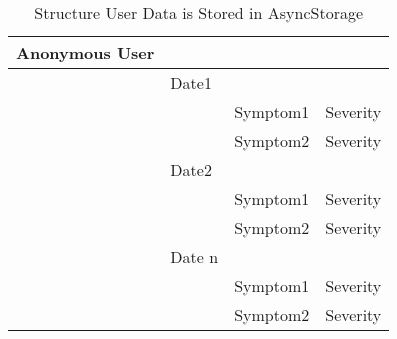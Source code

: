   \begin{table}[h!!]
    \caption{Structure User Data is Stored in AsyncStorage}
    \label{table:user-data}
    \begin{tabular}{llll}
    \hline
    Anonymous User &        &          &          \\ \hline
                  & Date1  &          &          \\
                  &        & Symptom1 & Severity \\
                  &        & Symptom2 & Severity \\
                  & Date2  &          &          \\
                  &        & Symptom1 & Severity \\
                  &        & Symptom2 & Severity \\
                  & Date n &          &          \\
                  &        & Symptom1 & Severity \\
                  &        & Symptom2 & Severity \\ \hline
    \end{tabular}
    \end{table}